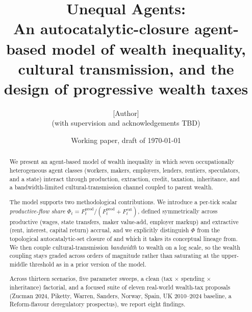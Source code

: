 \documentclass[11pt]{article}
\title{Unequal Agents:\\
\large An autocatalytic-closure agent-based model of wealth inequality,\\
cultural transmission, and the design of progressive wealth taxes}
\author{[Author]\\
\small (with supervision and acknowledgements TBD)}
\date{Working paper, draft of \today}
\begin{document}
\maketitle

\begin{abstract}
We present an agent-based model of wealth inequality in which seven
occupationally heterogeneous agent classes (workers, makers, employers,
lenders, rentiers, speculators, and a state) interact through production,
extraction, credit, taxation, inheritance, and a bandwidth-limited
cultural-transmission channel coupled to parent wealth.

The model supports two methodological contributions.  We introduce a
per-tick scalar \emph{productive-flow share}
$\Phi_t = F^\text{prod}_t / (F^\text{prod}_t + F^\text{ext}_t)$, defined
symmetrically across productive (wages, state transfers, maker
value-add, employer markup) and extractive (rent, interest, capital
return) accrual, and we explicitly distinguish
$\Phi$ from the topological autocatalytic-set closure of
\citet{kauffman1988evolution} and \citet{hordijk2004detecting} which it
takes its conceptual lineage from. We then couple cultural-transmission
\emph{bandwidth} to wealth on a log scale, so the wealth coupling stays
graded across orders of magnitude rather than saturating at the
upper-middle threshold as in a prior version of the model.

Across thirteen scenarios, five parameter sweeps, a clean
(tax $\times$ spending $\times$ inheritance) factorial, and a focused
suite of eleven real-world wealth-tax proposals (Zucman 2024, Piketty,
Warren, Sanders, Norway, Spain, UK 2010--2024 baseline, a Reform-flavour
deregulatory prospectus), we report eight findings.


\end{abstract}
\end{document}
